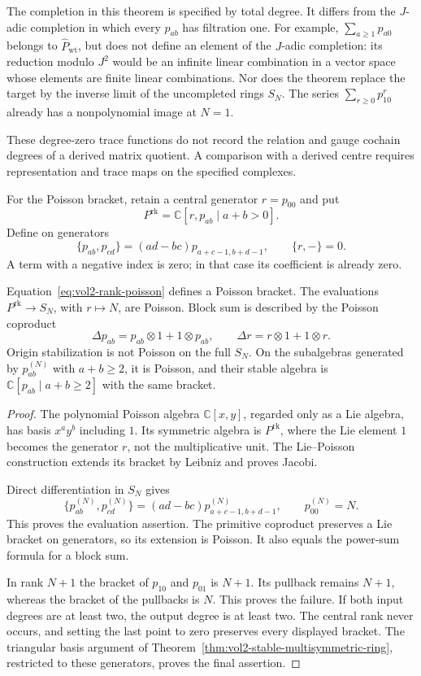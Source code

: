 The completion in this theorem is specified by total degree.
It differs from the $J$-adic completion in which every
$p_{ab}$ has filtration one.
For example,
$\sum_{a\geq1}p_{a0}$ belongs to
$\widehat P_{\mathrm{wt}}$, but does not define an element
of the $J$-adic completion: its reduction modulo $J^2$
would be an infinite linear combination in a vector space
whose elements are finite linear combinations.
Nor does the theorem replace the target by the inverse
limit of the uncompleted rings $S_N$.
The series $\sum_{r\geq0}p_{10}^r$ already has a
nonpolynomial image at $N=1$.

These degree-zero trace functions do not record
the relation and gauge cochain degrees of a
derived matrix quotient. A comparison with a
derived centre requires representation and trace
maps on the specified complexes.

For the Poisson bracket, retain a central generator
$r=p_{00}$ and put
\[
 P^{\mathrm{rk}}=\mathbb C[r,p_{ab}\mid a+b>0].
\]
Define on generators
\begin{equation}\label{eq:vol2-rank-poisson}
 \{p_{ab},p_{cd}\}=(ad-bc)p_{a+c-1,b+d-1},
 \qquad \{r,-\}=0.
\end{equation}
A term with a negative index is zero; in that case its
coefficient is already zero.

\begin{proposition}\label{prop:vol2-rank-poisson}
Equation~\eqref{eq:vol2-rank-poisson} defines a Poisson
bracket. The evaluations
$P^{\mathrm{rk}}\to S_N$, with $r\mapsto N$, are Poisson.
Block sum is described by the Poisson coproduct
\[
 \Delta p_{ab}=p_{ab}\otimes1+1\otimes p_{ab},
 \qquad
 \Delta r=r\otimes1+1\otimes r.
\]
Origin stabilization is not Poisson on the full $S_N$.
On the subalgebras generated by $p_{ab}^{(N)}$ with
$a+b\geq2$, it is Poisson, and their stable algebra is
$\mathbb C[p_{ab}\mid a+b\geq2]$ with the same bracket.
\end{proposition}
\begin{proof}
The polynomial Poisson algebra $\mathbb C[x,y]$, regarded
only as a Lie algebra, has basis $x^ay^b$ including $1$.
Its symmetric algebra is $P^{\mathrm{rk}}$, where the
Lie element $1$ becomes the generator $r$, not the
multiplicative unit. The Lie--Poisson construction extends
its bracket by Leibniz and proves Jacobi.

Direct differentiation in $S_N$ gives
\[
 \{p_{ab}^{(N)},p_{cd}^{(N)}\}
 =(ad-bc)p_{a+c-1,b+d-1}^{(N)},\qquad
 p_{00}^{(N)}=N.
\]
This proves the evaluation assertion.
The primitive coproduct preserves a Lie bracket on
generators, so its extension is Poisson.
It also equals the power-sum formula for a block sum.

In rank $N+1$ the bracket of $p_{10}$ and $p_{01}$ is
$N+1$. Its pullback remains $N+1$, whereas the bracket
of the pullbacks is $N$. This proves the failure.
If both input degrees are at least two, the output
degree is at least two. The central rank never occurs,
and setting the last point to zero preserves every
displayed bracket. The triangular basis argument of
Theorem~\ref{thm:vol2-stable-multisymmetric-ring}, restricted
to these generators, proves the final assertion.
\end{proof}

